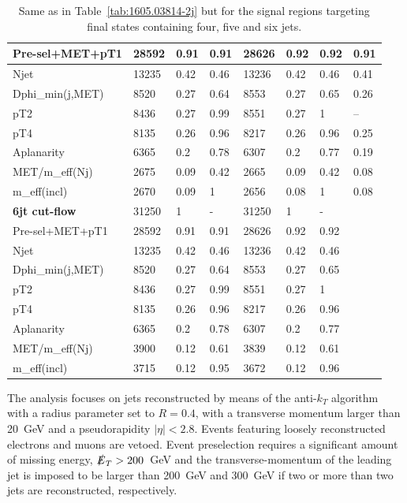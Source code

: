 \documentclass[11pt]{cernrep}
\begin{document}
\begin{table}
\begin{tabular}{ | l || l | l | l || l | l | l || l | }
Pre-sel+MET+pT1   & 28592 & 0.91 & 0.91 & 28626 & 0.92 & 0.92 & 0.91  \\ \hline
Njet              & 13235 & 0.42 & 0.46 & 13236 & 0.42 & 0.46 & 0.41  \\ \hline
Dphi\_min(j,MET)   & 8520 & 0.27 & 0.64 & 8553 & 0.27 & 0.65 & 0.26  \\ \hline
pT2               & 8436 & 0.27 & 0.99 & 8551 & 0.27 & 1 &    --        \\ \hline
pT4               & 8135 & 0.26 & 0.96 & 8217 & 0.26 & 0.96 & 0.25  \\ \hline
Aplanarity        & 6365 & 0.2 & 0.78 & 6307 & 0.2 & 0.77 & 0.19  \\ \hline
MET/m\_eff(Nj)     & 2675 & 0.09 & 0.42 & 2665 & 0.09 & 0.42 & 0.08  \\ \hline
m\_eff(incl)       & 2670 & 0.09 & 1 & 2656 & 0.08 & 1 & 0.08  \\ \hline
\hline
{\bf 6jt cut-flow} & 31250 & 1 & - & 31250 & 1 & - & \   \\ \hline
Pre-sel+MET+pT1   & 28592 & 0.91 & 0.91 & 28626 & 0.92 & 0.92 & \   \\ \hline
Njet              & 13235 & 0.42 & 0.46 & 13236 & 0.42 & 0.46 & \   \\ \hline
Dphi\_min(j,MET)   & 8520 & 0.27 & 0.64 & 8553 & 0.27 & 0.65 & \   \\ \hline
pT2               & 8436 & 0.27 & 0.99 & 8551 & 0.27 & 1 & \   \\ \hline
pT4               & 8135 & 0.26 & 0.96 & 8217 & 0.26 & 0.96 & \   \\ \hline
Aplanarity        & 6365 & 0.2 & 0.78 & 6307 & 0.2 & 0.77 & \   \\ \hline
MET/m\_eff(Nj)     & 3900 & 0.12 & 0.61 & 3839 & 0.12 & 0.61 & \   \\ \hline
m\_eff(incl)       & 3715 & 0.12 & 0.95 & 3672 & 0.12 & 0.96 & \   \\ \hline
 \end{tabular}
 \caption{Same as in Table~\ref{tab:1605.03814-2j} but for the signal regions
  targeting final states containing four, five and six jets.}
	\label{tab:1605.03814-nj}
\end{table}

The analysis focuses on jets reconstructed by means of the anti-$k_T$
algorithm~\cite{Cacciari:2008gp} with a radius parameter set to $R=0.4$, with
a transverse momentum larger than 20~GeV and a pseudorapidity $|\eta|<2.8$.
Events featuring loosely reconstructed electrons and muons are vetoed.
Event preselection requires a significant amount of missing energy,
$\slashed{E}_T > 200$~GeV and the transverse-momentum of the leading jet is
imposed to be larger than 200~GeV and 300~GeV if two or more than two jets are
reconstructed, respectively.
\end{document}
